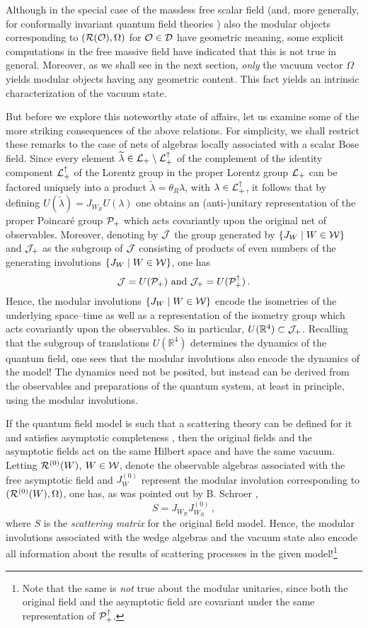\documentclass[12pt]{article}
\def\Ds{{\cal D}}
\def\Js{{\cal J}}
\def\Ls{{\cal L}}
\def\Os{{\cal O}}
\def\Ps{{\cal P}}
\def\Rs{{\cal R}}
\def\Ws{{\cal W}}
\def\Pid{{\Ps_+ ^{\uparrow}}}
\def\Lid{{\Ls_+ ^{\uparrow}}}
\def\RR{{\mathbb R}}
\def\beq{\begin{equation}}
\def\eeq{\end{equation}}
\begin{document}
     Although in the special case of the massless free scalar field
\cite{HiLo} (and, more generally, for conformally invariant quantum
field theories \cite{BrGuLo1}) also the modular objects corresponding
to $(\Rs(\Os),\Omega)$ for $\Os \in \Ds$ have geometric meaning, some
explicit computations in the free massive field have indicated that
this is not true in general. Moreover, as we shall see in the next
section, {\it only} the vacuum vector $\Omega$ yields modular objects
having any geometric content. This fact yields an intrinsic
characterization of the vacuum state.

     But before we explore this noteworthy state of affairs, let us
examine some of the more striking consequences of the above relations.
For simplicity, we shall restrict these remarks to the case of nets
of algebras locally associated with a scalar
Bose field. Since every element 
$\widetilde{\lambda} \in \Ls_+ \setminus \Lid$ of the complement of
the identity component $\Lid$ of the Lorentz group in the
proper Lorentz group $\Ls_+$ can be factored uniquely into a product 
$\widetilde{\lambda} = \theta_R \lambda$, with $\lambda \in \Lid$,
it follows that by defining $U(\widetilde{\lambda}) = J_{W_R} U(\lambda)$
one obtains an (anti-)unitary representation of the
proper Poincar\'e group $\Ps_+$ which acts covariantly upon the original
net of observables. Moreover, denoting by $\Js$ the group generated
by $\{ J_W \mid W \in \Ws\}$ and $\Js_+$ as the subgroup of $\Js$ consisting 
of products of even numbers of the generating involutions 
$\{ J_W \mid W \in \Ws\}$, one has 
%
\beq \label{lorentz}
\Js = U(\Ps_+) \,\, \textnormal{and} \, \, \Js_+ = U(\Pid) \, .
\eeq
%
Hence, the modular involutions $\{ J_W \mid W \in \Ws\}$ encode the
isometries of the underlying space--time as well as a representation
of the isometry group which acts covariantly upon the observables. So
in particular, $U(\RR^4) \subset \Js_+$. Recalling that the subgroup
of translations $U(\RR^4)$ determines the dynamics of the quantum
field, one sees that the modular involutions also encode the dynamics
of the model! The dynamics need not be posited, but instead can be
derived from the observables and preparations of the quantum system,
at least in principle, using the modular involutions.
     
     If the quantum field model is such that a scattering theory can
be defined for it and satisfies asymptotic completeness \cite{Ar,Jo,BLT}, 
then the original fields and the asymptotic fields act on the same
Hilbert space and have the same vacuum. Letting $\Rs^{(0)}(W)$, 
$W \in \Ws$, denote the observable algebras associated with the 
free asymptotic field and $J^{(0)}_W$ represent the modular
involution corresponding to $(\Rs^{(0)}(W), \Omega)$, one has,
as was pointed out by B. Schroer \cite{Sch},
%
$$S = J_{W_R} J_{W_R}^{(0)} \, ,$$
%
where $S$ is the {\it scattering matrix} for the original field 
model. Hence, the modular involutions associated with the wedge
algebras and the vacuum state also encode all information about the
results of scattering processes in the given model!\footnote{ Note that
the same is {\it not} true about the modular unitaries, since both
the original field and the asymptotic field are covariant under the
same representation of $\Pid$.} 
\end{document}
